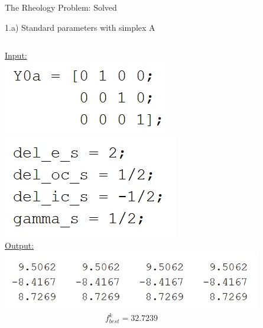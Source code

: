 \documentclass{beamer}
\begin{document}
\begin{frame}{The Rheology Problem: Solved}
\begin{block}{1.a) Standard parameters with simplex A}
\begin{columns}
\begin{column}{0.35\linewidth}
	\underline{Input:}\\
	\includegraphics[width=0.45\linewidth]{Y0a}\\
	\includegraphics[width=0.45\linewidth]{StandardParams}\\
	\vspace{0.65cm}
	\underline{Output:}\\
	\includegraphics[width=0.95\linewidth]{1aSimplex}
	$$f^k_{best} = 32.7239$$
	\vspace{0.1cm}
\end{column}
\begin{column}{0.63\linewidth}
	\begin{figure}
	\end{figure}	
\end{column}
\end{columns}
\end{block}
\end{frame}
\end{document}
